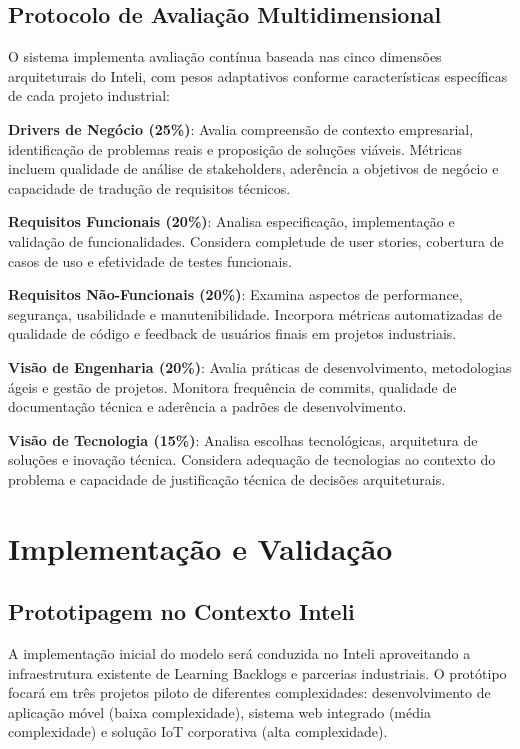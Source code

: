 \documentclass[english, spanish, brazilian]{RBIEarticle} %
\begin{document}
\subsection{Protocolo de Avaliação Multidimensional}

O sistema implementa avaliação contínua baseada nas cinco dimensões
arquiteturais do Inteli, com pesos adaptativos conforme características
específicas de cada projeto industrial:

\textbf{Drivers de Negócio (25\%)}: Avalia compreensão de contexto empresarial, identificação de problemas reais e proposição de soluções viáveis. Métricas incluem qualidade de análise de stakeholders, aderência a objetivos de negócio e capacidade de tradução de requisitos técnicos.

\textbf{Requisitos Funcionais (20\%)}: Analisa especificação, implementação e validação de funcionalidades. Considera completude de user stories, cobertura de casos de uso e efetividade de testes funcionais.

\textbf{Requisitos Não-Funcionais (20\%)}: Examina aspectos de performance, segurança, usabilidade e manutenibilidade. Incorpora métricas automatizadas de qualidade de código e feedback de usuários finais em projetos industriais.

\textbf{Visão de Engenharia (20\%)}: Avalia práticas de desenvolvimento, metodologias ágeis e gestão de projetos. Monitora frequência de commits, qualidade de documentação técnica e aderência a padrões de desenvolvimento.

\textbf{Visão de Tecnologia (15\%)}: Analisa escolhas tecnológicas, arquitetura de soluções e inovação técnica. Considera adequação de tecnologias ao contexto do problema e capacidade de justificação técnica de decisões arquiteturais.

\section{Implementação e Validação}

\subsection{Prototipagem no Contexto Inteli}

A implementação inicial do modelo será conduzida no Inteli aproveitando a
infraestrutura existente de Learning Backlogs e parcerias industriais. O
protótipo focará em três projetos piloto de diferentes complexidades:
desenvolvimento de aplicação móvel (baixa complexidade), sistema web integrado
(média complexidade) e solução IoT corporativa (alta complexidade).
\end{document}
